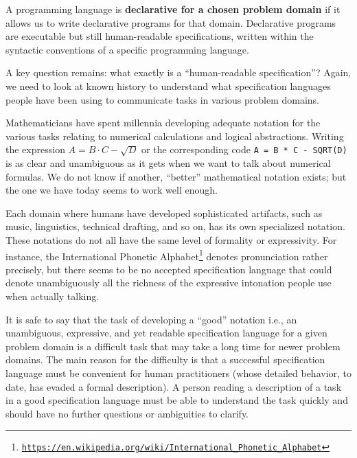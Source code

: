 A programming language is \textbf{declarative for a chosen problem
domain} if it allows us to write declarative programs for that domain.
Declarative programs are executable but still human-readable specifications,
written within the syntactic conventions of a specific programming
language.


A key question remains: what exactly is a \textsf{``}human-readable specification\textsf{''}?
Again, we need to look at known history to understand what specification
languages people have been using to communicate tasks in various problem
domains.

Mathematicians have spent millennia developing adequate notation for
the various tasks relating to numerical calculations and logical abstractions.
Writing the expression $A=B\cdot C-\sqrt{D}$ or the corresponding
code \lstinline!A = B * C - SQRT(D)! is as clear and unambiguous
as it gets when we want to talk about numerical formulas. We do not
know if another, \textsf{``}better\textsf{''} mathematical notation exists; but the
one we have today seems to work well enough.

Each domain where humans have developed sophisticated artifacts, such
as music, linguistics, technical drafting, and so on, has its own
specialized notation. These notations do not all have the same level
of formality or expressivity. For instance, the International Phonetic
Alphabet\footnote{\texttt{\href{https://en.wikipedia.org/wiki/International_Phonetic_Alphabet}{https://en.wikipedia.org/wiki/International\_Phonetic\_Alphabet}}}
denotes pronunciation rather precisely, but there seems to be no accepted
specification language that could denote unambiguously all the richness
of the expressive intonation people use when actually talking.

It is safe to say that the task of developing a \textsf{``}good\textsf{''} notation
\textemdash{} i.e., an unambiguous, expressive, and yet readable specification
language \textemdash{} for a given problem domain is a difficult task
that may take a long time for newer problem domains. The main reason
for the difficulty is that a successful specification language must
be convenient for human practitioners (whose detailed behavior, to
date, has evaded a formal description). A person reading a description
of a task in a good specification language must be able to understand
the task quickly and should have no further questions or ambiguities
to clarify.

